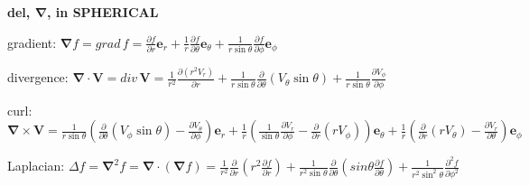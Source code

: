 \documentclass[letterpaper,landscape,10pt]{article}
\newenvironment{mydescription}
{\begin{description}
	\setlength{\itemsep}{0pt}
	\setlength{\parskip}{0pt}
	\setlength{\parsep}{-1pt}}
{\end{description}}
\begin{document}
{\begin{multicols}{3}
		\begin{center}\textbf{del, $\mathbf{\nabla}$, in SPHERICAL}\end{center}
		\begin{mydescription}
			\item[gradient:]
				$\mathbf{\nabla}f = grad\,f =
				\frac{\partial f}{\partial r}\mathbf{e}_r +
				\frac{1}{r}\frac{\partial f}{\partial \theta}\mathbf{e}_\theta +
				\frac{1}{r\sin\theta}\frac{\partial f}{\partial\phi}\mathbf{e}_\phi
				$
			\item[divergence:]
				$\mathbf{\nabla}\cdot\mathbf{V} = div\, \mathbf{V} =
				\frac{1}{r^2}\frac{\partial(r^2V_r)}{\partial r} +
				\frac{1}{r\sin\theta}\frac{\partial}{\partial\theta}\left({
				V_\theta\sin\theta}\right) +
				\frac{1}{r\sin\theta}\frac{\partial V_\phi}{\partial\phi}
				$
			\item[curl:]
				$\mathbf{\nabla}\times \mathbf{V} =
				\frac{1}{r\sin\theta}\left({ \frac{\partial}{\partial\theta}(V_\phi\sin\theta)-\frac{\partial V_\theta}{\partial\phi} }\right)\mathbf{e}_r +
				\frac{1}{r}\left({\frac{1}{\sin\theta}\frac{\partial V_r}{\partial\phi} - \frac{\partial}{\partial r}(r V_\phi) }\right) \mathbf{e}_\theta +
				\frac{1}{r}\left({\frac{\partial}{\partial r}(r V_\theta) -
				\frac{\partial V_r}{\partial\theta} }\right) \mathbf{e}_\phi
				$
			\item[Laplacian:]
				$\Delta f = \mathbf{\nabla}^2f =
				\mathbf{\nabla} \cdot (\mathbf{\nabla}f) =
				\frac{1}{r^2}\frac{\partial}{\partial r}\left( 
				r^2\frac{\partial f}{\partial r}\right) +
				\frac{1}{r^2\sin\theta}\frac{\partial}{\partial\theta}\left(
				sin\theta\frac{\partial f}{\partial\theta}\right) +
				\frac{1}{r^2\sin^2\theta}\frac{\partial^2f}{\partial\phi^2}
				$
		\end{mydescription}
		


\end{multicols}}
\end{document}
